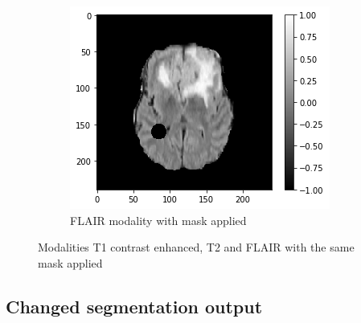 \begin{figure}[H]
        \begin{subfigure}{.33\textwidth}
        \centering
        \includegraphics[width=\linewidth]{chapters/06_hdm/images_masked/masked_3.png}
        \caption{FLAIR modality with mask applied}
    \end{subfigure}
    \caption{Modalities T1 contrast enhanced, T2 and FLAIR with the same mask applied}
\end{figure}

\subsection{Changed segmentation output}

